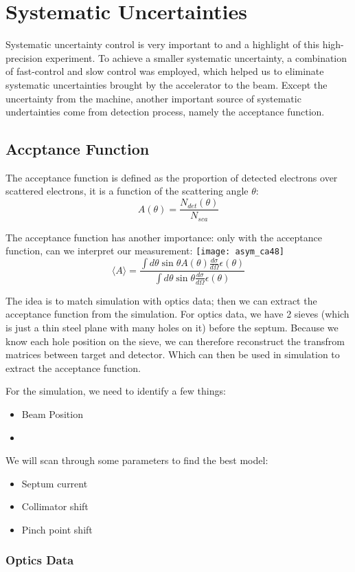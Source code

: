 \chapter{Systematic Uncertainties}

Systematic uncertainty control is very important to and a highlight of this 
high-precision experiment. To achieve a smaller systematic uncertainty, a
combination of fast-control and slow control was employed, which helped us
to eliminate systematic uncertainties brought by the accelerator to the
beam. Except the uncertainty from the machine, another important source
of systematic undertainties come from detection process, namely the 
acceptance function.

\section{Accptance Function}
The acceptance function is defined as the proportion of detected electrons
over scattered electrons, it is a function of the scattering angle $\theta$:
$$ A(\theta) = \frac{N_{det}(\theta)}{N_{sca}} $$

The acceptance function has another importance: only with the acceptance
function, can we interpret our measurement:
\texttt{[image: asym\_ca48]}
\begin{equation*}
    \langle A \rangle = \frac{\int d\theta \sin\theta A(\theta) \frac{d\sigma}{d\Omega} \epsilon(\theta)}{\int d\theta \sin\theta \frac{d\sigma}{d\Omega} \epsilon(\theta)}
\end{equation*}

The idea is to match simulation with optics data; then we can extract the 
acceptance function from the simulation. For optics data, we have 2 sieves
(which is just a thin steel plane with many holes on it) before the septum.
Because we know each hole position on the sieve, we can therefore reconstruct
the transfrom matrices between target and detector. Which can then be used in
simulation to extract the acceptance function.

For the simulation, we need to identify a few things:
\begin{itemize}
    \item Beam Position
    \item 
\end{itemize}

We will scan through some parameters to find the best model:
\begin{itemize}
    \item Septum current
    \item Collimator shift
    \item Pinch point shift
\end{itemize}

\subsection{Optics Data}
